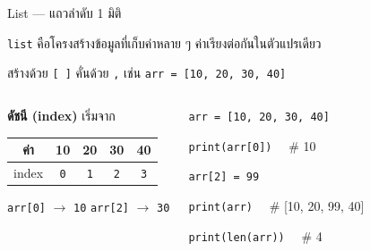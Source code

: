 \documentclass[11pt, aspectratio=169]{beamer}
\newcommand{\py}[1]{\texttt{#1}}
\begin{document}
\begin{frame}{List — แถวลำดับ 1 มิติ}
  \begin{explanation}[นิยาม]
    \py{list} คือโครงสร้างข้อมูลที่เก็บค่าหลาย ๆ ค่าเรียงต่อกันในตัวแปรเดียว

    สร้างด้วย \py{[ ]} คั่นด้วย \py{,} \quad เช่น \py{arr = [10, 20, 30, 40]}
  \end{explanation}
  \begin{columns}[T]
      \begin{explanation}
        \textbf{ดัชนี (index)} เริ่มจาก \highlight{\py{0}}

        \begin{tabular}{c|c|c|c|c}
          ค่า   & 10 & 20 & 30 & 40 \\
          \hline
          index & \py{0} & \py{1} & \py{2} & \py{3} \\
        \end{tabular}

        \py{arr[0]} $\rightarrow$ \py{10} \qquad
        \py{arr[2]} $\rightarrow$ \py{30}
      \end{explanation}
      \begin{exambox}
        \py{arr = [10, 20, 30, 40]}

        \py{print(arr[0])} \ \ {\small \# 10}

        \py{arr[2] = 99}

        \py{print(arr)} \ \ {\small \# [10, 20, 99, 40]}

        \py{print(len(arr))} \ \ {\small \# 4}
      \end{exambox}
  \end{columns}
\end{frame}
\end{document}
